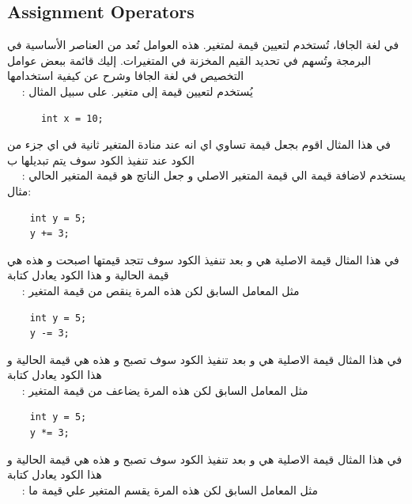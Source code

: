   \subsection{Assignment Operators}
  \begin{AR}
    في لغة الجافا، تُستخدم  لتعيين قيمة لمتغير. هذه العوامل تُعد من العناصر الأساسية في البرمجة وتُسهم في تحديد القيم المخزنة في المتغيرات. إليك قائمة ببعض عوامل التخصيص في لغة الجافا وشرح عن كيفية استخدامها
    \\
    \ \ \LR{\textcolor{theme}{- 1}}   \LR{(=)} : يُستخدم لتعيين قيمة إلى متغير. على سبيل المثال
  \end{AR}
  \begin{verbatim}
      int x = 10; 
  \end{verbatim}
  \begin{AR} 
  في هذا المثال اقوم بجعل قيمة   تساوي  اي انه عند منادة المتغير  ثانية في اي جزء من الكود عند تنفيذ الكود سوف يتم تبديلها ب 
    \\
    \ \ \LR{\textcolor{theme}{- 2}}  \LR{(+=)}  : يستخدم لاضافة قيمة الي قيمة المتغير الاصلي و جعل الناتج هو قيمة المتغير الحالي مثال:
  \end{AR}
  \begin{verbatim}
    int y = 5;
    y += 3;
  \end{verbatim}
  \begin{AR}
    في هذا المثال قيمة  الاصلية هي  و بعد تنفيذ الكود  سوف تتجد قيمتها اصبحت  و هذه هي قيمة  الحالية
    و هذا الكود يعادل كتابة 
    \\
    \ \ \LR{\textcolor{theme}{- 3}}    \LR{(-=)} : مثل المعامل السابق لكن هذه المرة ينقص من قيمة المتغير
  \end{AR}
  \begin{verbatim}
    int y = 5;
    y -= 3;
  \end{verbatim}
  \begin{AR}
    في هذا المثال قيمة  الاصلية هي  و بعد تنفيذ الكود  سوف تصبح  و هذه هي قيمة  الحالية
    و هذا الكود يعادل كتابة 
    \\
    \ \ \LR{\textcolor{theme}{- 4}}    \LR{(*=)} : مثل المعامل السابق لكن هذه المرة يضاعف من قيمة المتغير
  \end{AR}
  \begin{verbatim}
    int y = 5;
    y *= 3;
  \end{verbatim}
  \begin{AR}
    في هذا المثال قيمة  الاصلية هي  و بعد تنفيذ الكود  سوف تصبح  و هذه هي قيمة  الحالية
    و هذا الكود يعادل كتابة 
    \\
    \ \ \LR{\textcolor{theme}{- 5}} \LR{(/=)} : مثل المعامل السابق لكن هذه المرة يقسم المتغير علي قيمة ما
  \end{AR}
